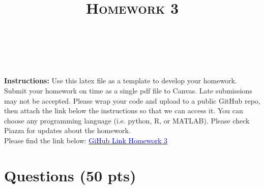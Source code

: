 \documentclass[a4paper]{article}
\title{\textsc{Homework 3}} %
\author{
\red{$>>$Anudeep Kumar$<<$} \\
\red{$>>$9084607069$<<$}\\
}
\date{}
\theoremstyle{definition}
\begin{document}
\maketitle 


\textbf{Instructions:} 
Use this latex file as a template to develop your homework. Submit your homework on time as a single pdf file to Canvas. Late submissions may not be accepted. Please wrap your code and upload to a public GitHub repo, then attach the link below the instructions so that we can access it. You can choose any programming language (i.e. python, R, or MATLAB). Please check Piazza for updates about the homework.\\
Please find the link below:
\href{https://github.com/anudeepk17/HW3Solution}{\textcolor{blue}{GiHub Link Homework 3}}


\section{Questions (50 pts)}
\end{document}
